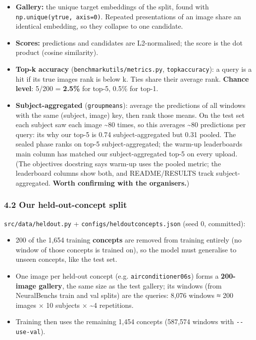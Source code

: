 \documentclass[
  11pt,
]{article}
\providecommand{\tightlist}{%
  \setlength{\itemsep}{0pt}\setlength{\parskip}{0pt}}
\renewcommand{\_}{\oldunderscore\allowbreak}
\begin{document}
\begin{itemize}
\tightlist
\item
  \textbf{Gallery:} the unique target
  embeddings of the split, found with
  \texttt{np.unique(y\_true,\ axis=0)}.
  Repeated presentations of an image
  share an identical embedding, so they
  collapse to one candidate.
\item
  \textbf{Scores:} predictions and
  candidates are L2-normalised; the
  score is the dot product (cosine
  similarity).
\item
  \textbf{Top-k accuracy}
  (\texttt{benchmark\_utils/metrics.py},
  \texttt{topk\_accuracy}): a query is a
  hit if its true
  image\textquotesingle s rank is below
  k. Ties share their average rank.
  \textbf{Chance level}: 5/200 =
  \textbf{2.5\%} for top-5, 0.5\% for
  top-1.
\item
  \textbf{Subject-aggregated}
  (\texttt{group\_means}): average the
  predictions of all windows with the
  same (subject, image) key, then rank
  those means. On the test set each
  subject saw each image
  \textasciitilde80 times, so this
  averages \textasciitilde80 predictions
  per query: it\textquotesingle s why
  our top-5 is 0.74 subject-aggregated
  but 0.31 pooled. The sealed phase
  ranks on top-5 subject-aggregated; the
  warm-up leaderboard\textquotesingle s
  main column has matched our
  subject-aggregated top-5 on every
  upload. (The
  objective\textquotesingle s docstring
  says warm-up uses the pooled metric;
  the leaderboard columns show both, and
  README/RESULTS track
  subject-aggregated. \textbf{Worth
  confirming with the organisers.})
\end{itemize}

\subsubsection{4.2 Our held-out-concept
split}\label{our-held-out-concept-split}

\texttt{src/data/heldout.py} +
\texttt{configs/heldout\_concepts.json}
(seed 0, committed):

\begin{itemize}
\tightlist
\item
  200 of the 1,654 training
  \textbf{concepts} are removed from
  training entirely (no window of those
  concepts is trained on), so the model
  must generalise to unseen concepts,
  like the test set.
\item
  One image per held-out concept (e.g.
  \texttt{air\_conditioner\_06s}) forms
  a \textbf{200-image gallery}, the same
  size as the test gallery; its windows
  (from NeuralBench\textquotesingle s
  train and val splits) are the queries:
  8,076 windows ≈ 200 images × 10
  subjects × \textasciitilde4
  repetitions.
\item
  Training then uses the remaining 1,454
  concepts (587,574 windows with
  \texttt{-\/-use-val}).
\end{itemize}
\end{document}
